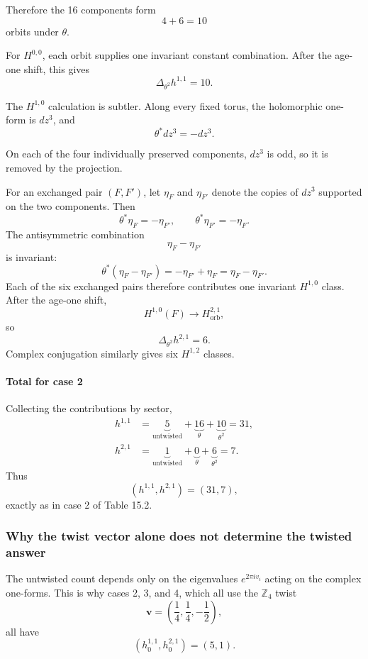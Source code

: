 \documentclass[
  10pt,
  a4paper,
  openany]{book}
\begin{document}
Therefore the 16 components form \[
4+6=10
\] orbits under \(\theta\).

For \(H^{0,0}\), each orbit supplies one invariant constant combination.
After the age-one shift, this gives \[
\boxed{\Delta_{\theta^2}h^{1,1}=10}.
\]

The \(H^{1,0}\) calculation is subtler. Along every fixed torus, the
holomorphic one-form is \(dz^3\), and \[
\theta^*dz^3=-dz^3.
\]

On each of the four individually preserved components, \(dz^3\) is odd,
so it is removed by the projection.

For an exchanged pair \((F,F')\), let \(\eta_F\) and \(\eta_{F'}\)
denote the copies of \(dz^3\) supported on the two components. Then \[
\theta^*\eta_F=-\eta_{F'},
\qquad
\theta^*\eta_{F'}=-\eta_F.
\] The antisymmetric combination \[
\eta_F-\eta_{F'}
\] is invariant: \[
\theta^*(\eta_F-\eta_{F'})
=
-\eta_{F'}+\eta_F
=
\eta_F-\eta_{F'}.
\] Each of the six exchanged pairs therefore contributes one invariant
\(H^{1,0}\) class. After the age-one shift, \[
H^{1,0}(F)\longrightarrow H_{\mathrm{orb}}^{2,1},
\] so \[
\boxed{\Delta_{\theta^2}h^{2,1}=6}.
\] Complex conjugation similarly gives six \(H^{1,2}\) classes.

\paragraph{Total for case 2}\label{total-for-case-2}

Collecting the contributions by sector, \[
\begin{aligned}
h^{1,1}
&=
\underbrace{5}_{\text{untwisted}}
+
\underbrace{16}_{\theta}
+
\underbrace{10}_{\theta^2}
=31,\\
h^{2,1}
&=
\underbrace{1}_{\text{untwisted}}
+
\underbrace{0}_{\theta}
+
\underbrace{6}_{\theta^2}
=7.
\end{aligned}
\] Thus \[
\boxed{(h^{1,1},h^{2,1})=(31,7)},
\] exactly as in case 2 of Table 15.2.

\subsubsection{Why the twist vector alone does not determine the twisted
answer}\label{why-the-twist-vector-alone-does-not-determine-the-twisted-answer}

The untwisted count depends only on the eigenvalues \(e^{2\pi i v_i}\)
acting on the complex one-forms. This is why cases 2, 3, and 4, which
all use the \(\mathbb Z_4\) twist \[
\mathbf v
=
\left(\frac14,\frac14,-\frac12\right),
\] all have \[
(h_0^{1,1},h_0^{2,1})=(5,1).
\]
\end{document}
